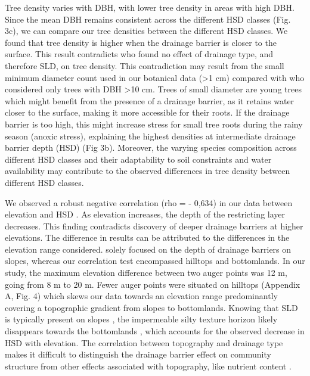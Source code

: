 \documentclass[fleqn,12pt]{latex/stylish_article} %
\begin{document}
Tree density varies with DBH, with lower tree density in areas with high DBH. Since the mean DBH remains consistent across the different HSD classes (Fig. 3c), we can compare our tree densities between the different HSD classes. We found that tree density is higher when the drainage barrier is closer to the surface. This result contradicts \citet{sabatierInfluenceSoilCover1997} who found no effect of drainage type, and therefore SLD, on tree density. This contradiction may result from the small minimum diameter count used in our botanical data (\textgreater1 cm) compared with \citet{sabatierInfluenceSoilCover1997} who considered only trees with DBH \textgreater10 cm. Trees of small diameter are young trees which might benefit from the presence of a drainage barrier, as it retains water closer to the surface, making it more accessible for their roots. If the drainage barrier is too high, this might increase stress for small tree roots during the rainy season (anoxic stress), explaining the highest densities at intermediate drainage barrier depth (HSD) (Fig 3b). Moreover, the varying species composition across different HSD classes and their adaptability to soil constraints and water availability may contribute to the observed differences in tree density between different HSD classes.

We observed a robust negative correlation (rho = - 0,634) in our data between elevation and HSD . As elevation increases, the depth of the restricting layer decreases. This finding contradicts \citet{epronSpatialVariationSoil2006} discovery of deeper drainage barriers at higher elevations. The difference in results can be attributed to the differences in the elevation range considered. \citet{epronSpatialVariationSoil2006} solely focused on the depth of drainage barriers on slopes, whereas our correlation test encompassed hilltops and bottomlands. In our study, the maximum elevation difference between two auger points was 12 m, going from 8 m to 20 m. Fewer auger points were situated on hilltops (Appendix A, Fig. 4) which skews our data towards an elevation range predominantly covering a topographic gradient from slopes to bottomlands. Knowing that SLD is typically present on slopes \citep{fanHydrologicRegulationPlant2017, pelissierWithinplotRelationshipsTree2002}, the impermeable silty texture horizon likely disappears towards the bottomlands \citep{bouletAnalyseStructuraleCartographie1982}, which accounts for the observed decrease in HSD with elevation. The correlation between topography and drainage type makes it difficult to distinguish the drainage barrier effect on community structure from other effects associated with topography, like nutrient content \citep{pegueroNutrientbasedSpeciesSelection2023, vanlangenhoveNaarEenBeter2020}.
\end{document}
